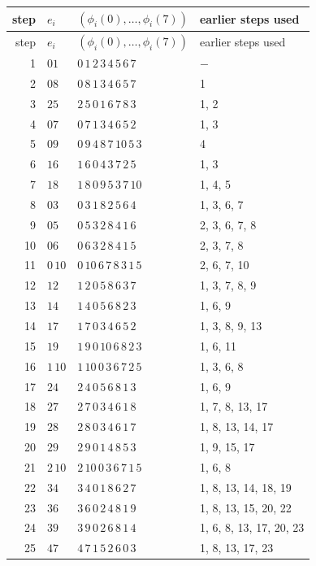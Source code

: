 \begin{longtable}{r l l l}
\toprule
step & $e_i$ & $(\phi_i(0),\ldots,\phi_i(7))$ & earlier steps used \\
\midrule
\endfirsthead
\toprule
step & $e_i$ & $(\phi_i(0),\ldots,\phi_i(7))$ & earlier steps used \\
\midrule
\endhead
1 & $01$ & $0\,1\,2\,3\,4\,5\,6\,7$ & $-$ \\
2 & $08$ & $0\,8\,1\,3\,4\,6\,5\,7$ & 1 \\
3 & $25$ & $2\,5\,0\,1\,6\,7\,8\,3$ & 1, 2 \\
4 & $07$ & $0\,7\,1\,3\,4\,6\,5\,2$ & 1, 3 \\
5 & $09$ & $0\,9\,4\,8\,7\,10\,5\,3$ & 4 \\
6 & $16$ & $1\,6\,0\,4\,3\,7\,2\,5$ & 1, 3 \\
7 & $18$ & $1\,8\,0\,9\,5\,3\,7\,10$ & 1, 4, 5 \\
8 & $03$ & $0\,3\,1\,8\,2\,5\,6\,4$ & 1, 3, 6, 7 \\
9 & $05$ & $0\,5\,3\,2\,8\,4\,1\,6$ & 2, 3, 6, 7, 8 \\
10 & $06$ & $0\,6\,3\,2\,8\,4\,1\,5$ & 2, 3, 7, 8 \\
11 & $0\,10$ & $0\,10\,6\,7\,8\,3\,1\,5$ & 2, 6, 7, 10 \\
12 & $12$ & $1\,2\,0\,5\,8\,6\,3\,7$ & 1, 3, 7, 8, 9 \\
13 & $14$ & $1\,4\,0\,5\,6\,8\,2\,3$ & 1, 6, 9 \\
14 & $17$ & $1\,7\,0\,3\,4\,6\,5\,2$ & 1, 3, 8, 9, 13 \\
15 & $19$ & $1\,9\,0\,10\,6\,8\,2\,3$ & 1, 6, 11 \\
16 & $1\,10$ & $1\,10\,0\,3\,6\,7\,2\,5$ & 1, 3, 6, 8 \\
17 & $24$ & $2\,4\,0\,5\,6\,8\,1\,3$ & 1, 6, 9 \\
18 & $27$ & $2\,7\,0\,3\,4\,6\,1\,8$ & 1, 7, 8, 13, 17 \\
19 & $28$ & $2\,8\,0\,3\,4\,6\,1\,7$ & 1, 8, 13, 14, 17 \\
20 & $29$ & $2\,9\,0\,1\,4\,8\,5\,3$ & 1, 9, 15, 17 \\
21 & $2\,10$ & $2\,10\,0\,3\,6\,7\,1\,5$ & 1, 6, 8 \\
22 & $34$ & $3\,4\,0\,1\,8\,6\,2\,7$ & 1, 8, 13, 14, 18, 19 \\
23 & $36$ & $3\,6\,0\,2\,4\,8\,1\,9$ & 1, 8, 13, 15, 20, 22 \\
24 & $39$ & $3\,9\,0\,2\,6\,8\,1\,4$ & 1, 6, 8, 13, 17, 20, 23 \\
25 & $47$ & $4\,7\,1\,5\,2\,6\,0\,3$ & 1, 8, 13, 17, 23 \\

\end{longtable}
